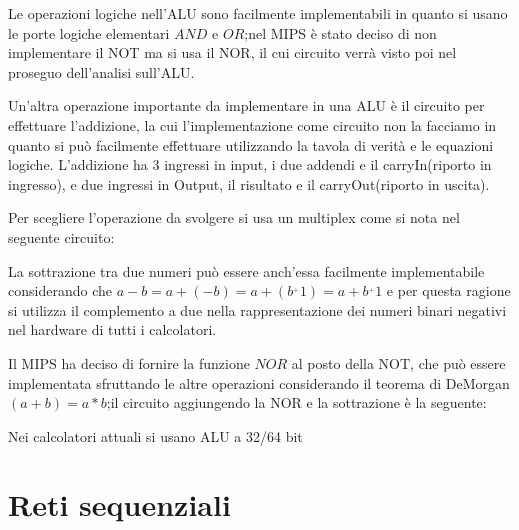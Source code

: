 Le operazioni logiche nell'ALU sono facilmente implementabili in quanto si usano le
porte logiche elementari $AND$ e $OR$;nel MIPS è stato deciso di non implementare
il NOT ma si usa il NOR, il cui circuito verrà visto poi nel proseguo dell'analisi sull'ALU.

Un'altra operazione importante da implementare in una ALU è il circuito per effettuare
l'addizione, la cui l'implementazione come circuito non la facciamo in quanto si può
facilmente effettuare utilizzando la tavola di verità e le equazioni logiche.\newline
L'addizione ha 3 ingressi in input, i due addendi e il carryIn(riporto in ingresso),
e due ingressi in Output, il risultato e il carryOut(riporto in uscita).

Per scegliere l'operazione da svolgere si usa un multiplex come si nota nel seguente circuito:

La sottrazione tra due numeri può essere anch'essa facilmente implementabile considerando
che $a-b = a + (-b) = a + (b^_ + 1) = a + b^_ + 1$ e per questa ragione si utilizza
il complemento a due nella rappresentazione dei numeri binari negativi nel hardware di tutti i calcolatori.

Il MIPS ha deciso di fornire la funzione $NOR$ al posto della NOT, che può essere
implementata sfruttando le altre operazioni considerando il teorema di DeMorgan
$(a + b) = a * b$;il circuito aggiungendo la NOR e la sottrazione è la seguente:


Nei calcolatori attuali si usano ALU a 32/64 bit 
\section{Reti sequenziali}
